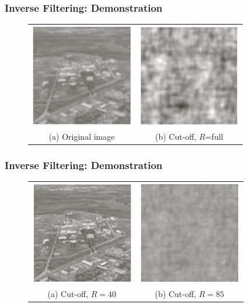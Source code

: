 \documentclass[english,11pt,table,handout]{beamer}
\begin{document}
\frame
{
	\frametitle{Inverse Filtering: Demonstration }
	\begin{figure}[!h]
		\begin{tabular}{cc}
			\includegraphics[height=4.5cm]{inverse_filter_original.png} &
			\includegraphics[height=4.5cm]{inverse_filter_full.png} \\
			(a) Original image & (b) Cut-off, $R$=full\\
		\end{tabular}
	\end{figure}
}
\frame
{
	\frametitle{Inverse Filtering: Demonstration }
	\begin{figure}[!h]
		\begin{tabular}{cc}
			\includegraphics[height=4.5cm]{inverse_filter_off_r40.png} &
			\includegraphics[height=4.5cm]{inverse_filter_off_r85.png} \\
			(a) Cut-off, $R=40$ & (b) Cut-off, $R=85$\\
		\end{tabular}
	\end{figure}
}
\end{document}
